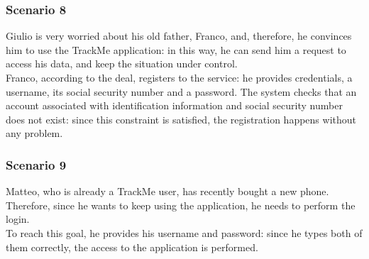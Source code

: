 \subsubsection{Scenario 8}
Giulio is very worried about his old father, Franco, and, therefore, he convinces him to use the TrackMe application: in this way, he can send him a request to access his data, and keep the situation under control. \\
Franco, according to the deal, registers to the service: he provides credentials, a username, its social security number and a password. 
The system checks that an account associated with identification information and social security number does not exist: since this constraint is satisfied, the registration happens without any problem.  

\subsubsection{Scenario 9}
Matteo, who is already a TrackMe user, has recently bought a new phone.
Therefore, since he wants to keep using the application, he needs to perform the login.\\
To reach this goal, he provides his username and password: since he types both of them correctly, the access to the application is performed. 
